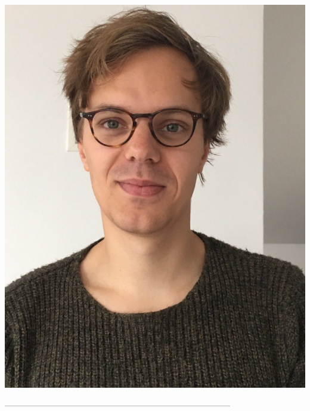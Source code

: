 \documentclass{scrartcl}
\begin{document}
\setlength\parindent{0ex}
\begin{adjustwidth}{0.5in}{0in}
	\begin{center}
	{\Huge{\textbf{\textsf\TheMainTitle}}}
	
	\vspace*{0.4cm}
	
	{\Large{\textsf\TheSubTitle}}
	\end{center}
	
	\vspace*{0.5cm}

  \begin{multicols}{2}
	\AuthorBio
	\hspace*{0.075\textwidth}%
	\includegraphics[scale=0.375]{../images/AuthorIcon.jpg}%
  \end{multicols}


	

	\vspace*{0.1cm}

	\begin{center}
	---------------------------------------------------------------------------------
	\end{center}
	\vspace*{0.1cm}

	\BackDescription
	
\end{adjustwidth}
\end{document}
